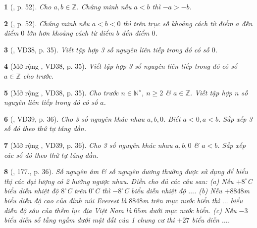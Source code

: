 \documentclass{article}
\newtheorem{baitoan}{}
\begin{document}
\begin{baitoan}[\cite{Binh_boi_duong_Toan_6_tap_1}, p. 52]
	Cho $a,b\in\mathbb{Z}$. Chứng minh nếu $a < b$ thì $-a > -b$.	
\end{baitoan}

\begin{baitoan}[\cite{Binh_boi_duong_Toan_6_tap_1}, p. 52]
	Chứng minh nếu $a < b < 0$ thì trên trục số khoảng cách từ điểm $a$ đến điểm $0$ lớn hơn khoảng cách từ điểm $b$ đến điểm $0$.	
\end{baitoan}

\begin{baitoan}[\cite{Tuyen_Toan_6}, VD38, p. 35]
	Viết tập hợp 3 số nguyên liên tiếp trong đó có số $0$.
\end{baitoan}

\begin{baitoan}[Mở rộng \cite{Tuyen_Toan_6}, VD38, p. 35]
	Viết tập hợp 3 số nguyên liên tiếp trong đó có số $a\in\mathbb{Z}$ cho trước.
\end{baitoan}

\begin{baitoan}[Mở rộng \cite{Tuyen_Toan_6}, VD38, p. 35]
	\label{prob: Mở rộng VD38, p. 35}
	Cho trước $n\in\mathbb{N}^\star$, $n\ge2$ \& $a\in\mathbb{Z}$. Viết tập hợp $n$ số nguyên liên tiếp trong đó có số $a$.
\end{baitoan}

\begin{baitoan}[\cite{Tuyen_Toan_6}, VD39, p. 36]
	Cho 3 số nguyên khác nhau $a,b,0$. Biết $a < 0,a < b$. Sắp xếp 3 số đó theo thứ tự tăng dần.
\end{baitoan}

\begin{baitoan}[Mở rộng \cite{Tuyen_Toan_6}, VD39, p. 36]
	Cho 3 số nguyên khác nhau $a,b,0$ \& $a < b$. Sắp xếp các số đó theo thứ tự tăng dần.
\end{baitoan}

\begin{baitoan}[\cite{Tuyen_Toan_6}, 177., p. 36]
	Số nguyên âm \& số nguyên dương thường được sử dụng để biểu thị các đại lượng có 2 hướng ngược nhau. Điền cho đủ các câu sau: (a) Nếu $+8^\circ$C biểu diễn nhiệt độ $8^\circ$C trên $0^\circ$C thì $-8^\circ$C biểu diễn nhiệt độ $\ldots$. (b) Nếu $+8848$\emph{m} biểu diễn độ cao của đỉnh núi Everest là $8848$\emph{m} trên mực nước biển thì $\ldots$ biểu diễn độ sâu của thềm lục địa Việt Nam là $65$\emph{m} dưới mực nước biển. (c) Nếu $-3$ biểu diễn số tầng ngầm dưới mặt đất của 1 chung cư thì $+27$ biểu diễn $\ldots$.
\end{baitoan}
\end{document}
